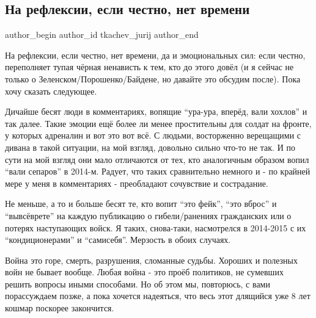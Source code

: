  
 
 
 
 
 
\subsection{На рефлексии, если честно, нет времени}
\label{sec:24_02_2022.tg.tkachev_jurij.1.refleksii}
 
\ifcmt
 author_begin
   author_id tkachev_jurij
 author_end
\fi

На рефлексии, если честно, нет времени, да и эмоциональных сил: если честно,
переполняет тупая чёрная ненависть к тем, кто до этого довёл (и я сейчас не
только о Зеленском/Порошенко/Байдене, но давайте это обсудим после). Пока хочу
сказать следующее.

Дичайше бесят люди в комментариях, вопящие \enquote{ура-ура, вперёд, вали
хохлов} и так далее. Такие эмоции ещё более ли менее простительны для солдат на
фронте, у которых адреналин и вот это вот всё. С людьми, восторженно верещащими
с дивана в такой ситуации, на мой взгляд, довольно сильно что-то не так. И по
сути на мой взгляд они мало отличаются от тех, кто аналогичным образом вопил
\enquote{вали сепаров} в 2014-м. Радует, что таких сравнительно немного и - по
крайней мере у меня в комментариях - преобладают сочувствие и сострадание.

Не меньше, а то и больше бесят те, кто вопит \enquote{это фейк}, \enquote{это
вброс} и \enquote{вывсёврете} на каждую публикацию о гибели/ранениях
гражданских или о потерях наступающих войск. Я таких, снова-таки, насмотрелся в
2014-2015 с их \enquote{кондиционерами} и \enquote{самисебя}. Мерзость в обоих
случаях.

Война это горе, смерть, разрушения, сломанные судьбы. Хороших и полезных войн
не бывает вообще. Любая война - это проёб политиков, не сумевших решить вопросы
иными способами. Но об этом мы, повторюсь, с вами порассуждаем позже, а пока
хочется надеяться, что весь этот длящийся уже 8 лет кошмар поскорее закончится.
